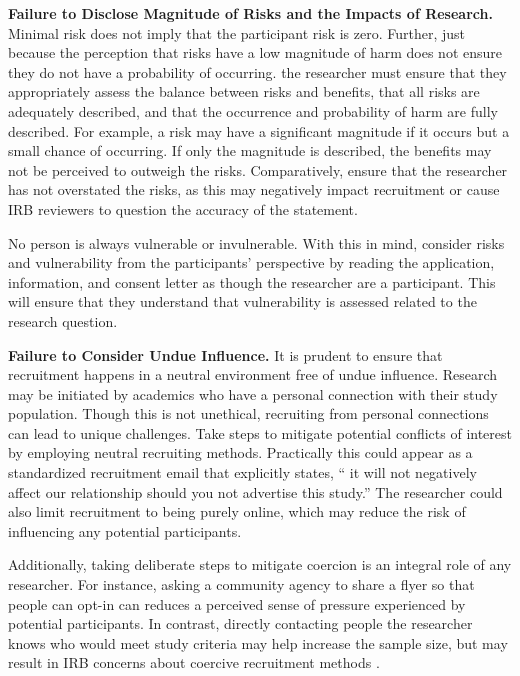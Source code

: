 \documentclass[
  11pt,
]{book}
\begin{document}
\textbf{Failure to Disclose Magnitude of Risks and the Impacts of Research.} Minimal risk does not imply that the participant risk is zero. Further, just because the perception that risks have a low magnitude of harm does not ensure they do not have a probability of occurring. the researcher must ensure that they appropriately assess the balance between risks and benefits, that all risks are adequately described, and that the occurrence and probability of harm are fully described. For example, a risk may have a significant magnitude if it occurs but a small chance of occurring. If only the magnitude is described, the benefits may not be perceived to outweigh the risks. Comparatively, ensure that the researcher has not overstated the risks, as this may negatively impact recruitment or cause IRB reviewers to question the accuracy of the statement.

No person is always vulnerable or invulnerable. With this in mind, consider risks and vulnerability from the participants' perspective by reading the application, information, and consent letter as though the researcher are a participant. This will ensure that they understand that vulnerability is assessed related to the research question.

\textbf{Failure to Consider Undue Influence.} It is prudent to ensure that recruitment happens in a neutral environment free of undue influence. Research may be initiated by academics who have a personal connection with their study population. Though this is not unethical, recruiting from personal connections can lead to unique challenges. Take steps to mitigate potential conflicts of interest by employing neutral recruiting methods. Practically this could appear as a standardized recruitment email that explicitly states, `` it will not negatively affect our relationship should you not advertise this study.'' The researcher could also limit recruitment to being purely online, which may reduce the risk of influencing any potential participants.

Additionally, taking deliberate steps to mitigate coercion is an integral role of any researcher. For instance, asking a community agency to share a flyer so that people can opt-in can reduces a perceived sense of pressure experienced by potential participants. In contrast, directly contacting people the researcher knows who would meet study criteria may help increase the sample size, but may result in IRB concerns about coercive recruitment methods \citep{klitzman_how_2013}.
\end{document}
